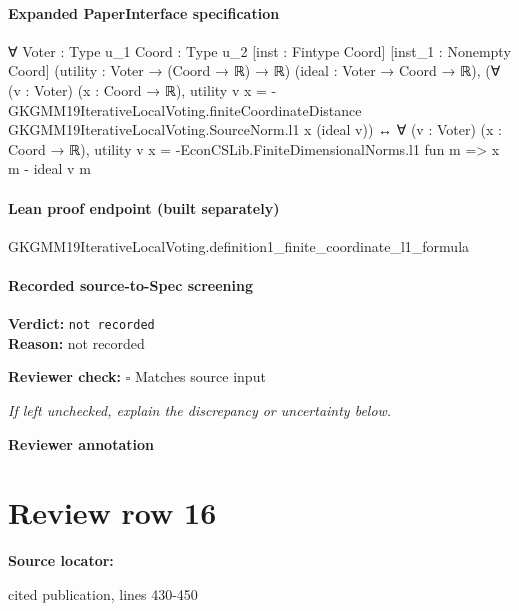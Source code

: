 \documentclass[10pt]{article}
\newcommand{\reviewerbox}{%
  \par\noindent\fbox{\parbox{0.96\linewidth}{\rule{0pt}{0.38in}}}\par
}
\newcommand{\reviewmatch}[1]{%
  \par\noindent\textbf{Reviewer check:} $\square$\; #1\par
  \noindent\emph{If left unchecked, explain the discrepancy or uncertainty below.}\par
}
\begin{document}
\paragraph{Expanded PaperInterface specification}
\begin{ReviewVerbatim}
∀ {Voter : Type u_1} {Coord : Type u_2} [inst : Fintype Coord] [inst_1 : Nonempty Coord]
  (utility : Voter → (Coord → ℝ) → ℝ) (ideal : Voter → Coord → ℝ),
  (∀ (v : Voter) (x : Coord → ℝ),
      utility v x =
        -GKGMM19IterativeLocalVoting.finiteCoordinateDistance GKGMM19IterativeLocalVoting.SourceNorm.l1 x (ideal v)) ↔
    ∀ (v : Voter) (x : Coord → ℝ), utility v x = -EconCSLib.FiniteDimensionalNorms.l1 fun m => x m - ideal v m
\end{ReviewVerbatim}

\paragraph{Lean proof endpoint (built separately)}\begin{ReviewVerbatim}
GKGMM19IterativeLocalVoting.definition1_finite_coordinate_l1_formula
\end{ReviewVerbatim}

\paragraph{Recorded source-to-Spec screening}
\textbf{Verdict:} \texttt{not recorded}
\\
\textbf{Reason:} not recorded
\reviewmatch{Matches source input}
\noindent\textbf{Reviewer annotation}\par
\reviewerbox
\clearpage
\hypertarget{source-claim-99e53b00c8291417}{}
\section*{Review row 16}
\textbf{Source locator:} {\footnotesize\raggedright cited publication, lines 430-\allowbreak{}450\par}
\end{document}

